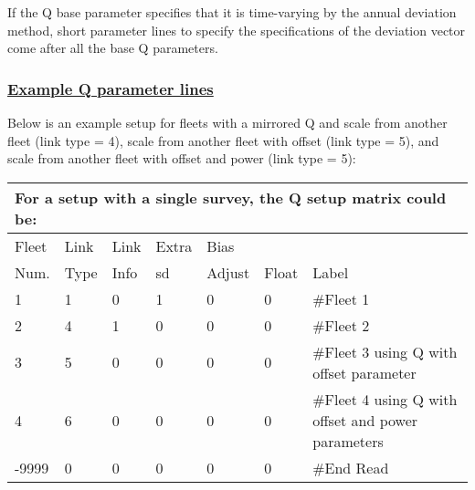 If the Q base parameter specifies that it is time-varying by the annual deviation method, short parameter lines to specify the specifications of the deviation vector come after all the base Q parameters.

\hypertarget{QParams}{}
\subsubsection[Example Q parameter lines]{\protect\hyperlink{QParams}{Example Q parameter lines}}
Below is an example setup for fleets with a mirrored Q and scale from another fleet (link type = 4), scale from another fleet with offset (link type = 5), and scale from another fleet with offset and power (link type = 5):
\begin{longtable}{p{1cm} p{1cm} p{1cm} p{1cm} p{1cm} p{1cm} p{7.6cm}}
	\multicolumn{7}{l}{For a setup with a single survey, the Q setup matrix could be:} \\
	\hline
	Fleet \Tstrut & Link & Link & Extra    & Bias   & & \\
	Num.          & Type & Info & \gls{sd} & Adjust & Float & Label \Bstrut\\
	\hline
	1 & 1 & 0 & 1 & 0 & 0 & \#Fleet 1 \Tstrut\\
	2 & 4 & 1 & 0 & 0 & 0 & \#Fleet 2 \\
	3 & 5 & 0 & 0 & 0 & 0 & \#Fleet 3 using Q with offset parameter \\
    4 & 6 & 0 & 0 & 0 & 0 & \#Fleet 4 using Q with offset and power parameters \\
	-9999 & 0 & 0 & 0 & 0 & 0 & \#End Read \Bstrut\\
	\hline
\end{longtable}


